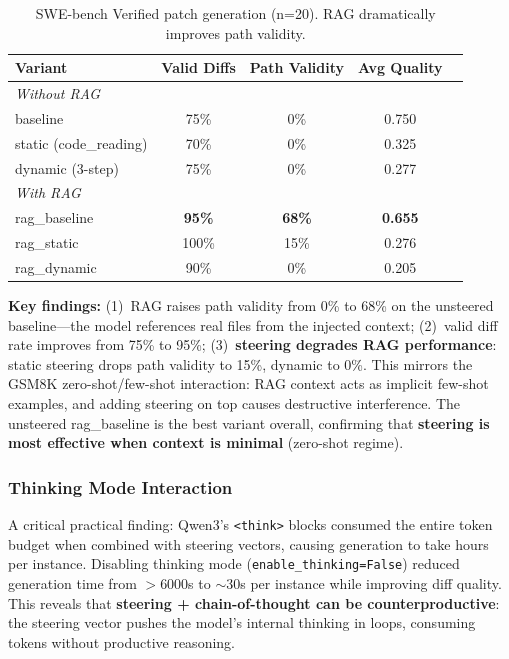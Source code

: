 \documentclass[11pt,a4paper]{article}
\begin{document}
\begin{table}[H]
\centering
\caption{SWE-bench Verified patch generation (n=20). RAG dramatically improves path validity.}
\label{tab:swebench_rag}
\small
\begin{tabular}{lcccc}
\toprule
\textbf{Variant} & \textbf{Valid Diffs} & \textbf{Path Validity} & \textbf{Avg Quality} \\
\midrule
\multicolumn{4}{l}{\textit{Without RAG}} \\
\quad baseline & 75\% & 0\% & 0.750 \\
\quad static (code\_reading) & 70\% & 0\% & 0.325 \\
\quad dynamic (3-step) & 75\% & 0\% & 0.277 \\
\midrule
\multicolumn{4}{l}{\textit{With RAG}} \\
\quad rag\_baseline & \textbf{95\%} & \textbf{68\%} & \textbf{0.655} \\
\quad rag\_static & 100\% & 15\% & 0.276 \\
\quad rag\_dynamic & 90\% & 0\% & 0.205 \\
\bottomrule
\end{tabular}
\end{table}

\textbf{Key findings:} (1)~RAG raises path validity from 0\% to 68\% on the unsteered baseline---the model references real files from the injected context; (2)~valid diff rate improves from 75\% to 95\%; (3)~\textbf{steering degrades RAG performance}: static steering drops path validity to 15\%, dynamic to 0\%. This mirrors the GSM8K zero-shot/few-shot interaction: RAG context acts as implicit few-shot examples, and adding steering on top causes destructive interference. The unsteered rag\_baseline is the best variant overall, confirming that \textbf{steering is most effective when context is minimal} (zero-shot regime).

\subsubsection{Thinking Mode Interaction}
A critical practical finding: Qwen3's \texttt{<think>} blocks consumed the entire token budget when combined with steering vectors, causing generation to take hours per instance. Disabling thinking mode (\texttt{enable\_thinking=False}) reduced generation time from $>$6000s to $\sim$30s per instance while improving diff quality. This reveals that \textbf{steering + chain-of-thought can be counterproductive}: the steering vector pushes the model's internal thinking in loops, consuming tokens without productive reasoning.
\end{document}
